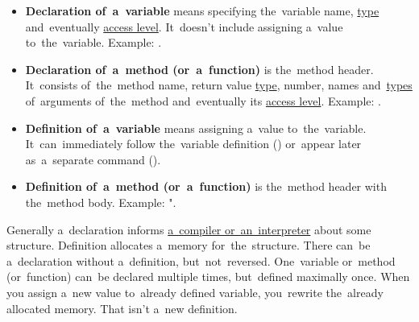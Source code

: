 \label{declarationdefinition}
\begin{itemize}
    \item \textbf{Declaration of~a~variable} means specifying the~variable name, \hyperref[datatypes]{type} and~eventually \hyperref[accessmodifiers]{access level}. It~doesn't include assigning a~value to~the~variable. Example: .
    \item \textbf{Declaration of~a~method (or~a~function)} is the~method header. It~consists of~the~method name, return value \hyperref[datatypes]{type}, number, names and~\hyperref[datatypes]{types} of~arguments of~the~method and~eventually its \hyperref[accessmodifiers]{access level}. Example: .
    \item \textbf{Definition of~a~variable} means assigning a~value to~the~variable. It~can~immediately follow the~variable definition () or~appear later as~a~separate command ().
    \item \textbf{Definition of~a~method (or~a~function)} is the~method header with the~method body. Example: ".
\end{itemize}
\noindent Generally a~declaration informs \hyperref[compiledinterpretedlanguages]{a~compiler or~an~interpreter} about some structure. Definition allocates a~memory for~the~structure. There can~be a~declaration without a~definition, but~not~reversed. One~variable or~method (or~function) can~be declared multiple times, but~defined maximally once. When you assign a~new value to~already defined variable, you~rewrite the~already allocated memory. That isn't a~new definition.

